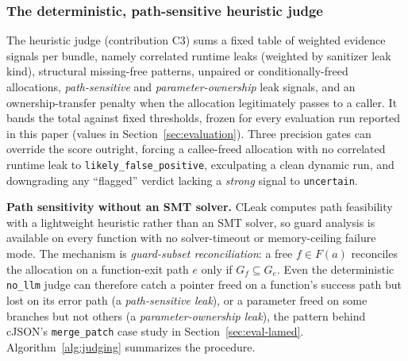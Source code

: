 \documentclass[a4paper]{llncs}
\begin{document}
\subsubsection{The deterministic, path-sensitive heuristic judge}

The heuristic judge (contribution C3) sums a fixed table of weighted
evidence signals per bundle, namely correlated runtime leaks (weighted by
sanitizer leak kind), structural missing-free patterns,
unpaired or conditionally-freed allocations, \emph{path-sensitive} and
\emph{parameter-ownership} leak signals, and an
ownership-transfer penalty when the allocation legitimately passes to a
caller. It bands the total against fixed thresholds, frozen for every
evaluation run reported in this paper (values in
Section~\ref{sec:evaluation}). Three precision gates can override the
score outright, forcing a callee-freed allocation with no correlated
runtime leak to \texttt{likely\_false\_positive}, exculpating a clean
dynamic run, and downgrading any ``flagged'' verdict lacking a
\emph{strong} signal to \texttt{uncertain}.

\textbf{Path sensitivity without an SMT solver.} CLeak computes path
feasibility with a lightweight heuristic rather than an SMT solver, so
guard analysis is available on every function with no solver-timeout or
memory-ceiling failure mode. The mechanism is \emph{guard-subset
reconciliation}: a free $f \in F(a)$ reconciles the
allocation on a function-exit path $e$ only if $G_f \subseteq G_e$.
Even the
deterministic \texttt{no\_llm} judge can therefore catch a
pointer freed on a function's success path but lost on its error path
(a \emph{path-sensitive leak}), or a parameter freed on some branches
but not others (a \emph{parameter-ownership leak}), the pattern
behind cJSON's \texttt{merge\_patch} case study in
Section~\ref{sec:eval-lamed}. Algorithm~\ref{alg:judging} summarizes
the procedure.
\end{document}
